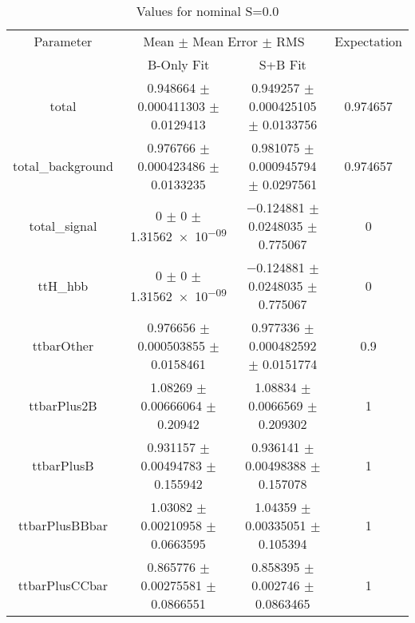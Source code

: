 \begin{table}
\centering
\caption{Values for nominal S=0.0}
\begin{tabular}{cccc}
\toprule
Parameter & \multicolumn{2}{c}{Mean $\pm$ Mean Error $\pm$ RMS} & Expectation\\
 & B-Only Fit & S+B Fit & \\
\midrule
total & \num{0.948664} $\pm$ \num{0.000411303} $\pm$ \num{0.0129413} & \num{0.949257} $\pm$ \num{0.000425105} $\pm$ \num{0.0133756} & \num{0.974657}\\
total\_background & \num{0.976766} $\pm$ \num{0.000423486} $\pm$ \num{0.0133235} & \num{0.981075} $\pm$ \num{0.000945794} $\pm$ \num{0.0297561} & \num{0.974657}\\
total\_signal & \num{0} $\pm$ \num{0} $\pm$ \num{1.31562e-09} & \num{-0.124881} $\pm$ \num{0.0248035} $\pm$ \num{0.775067} & \num{0}\\
ttH\_hbb & \num{0} $\pm$ \num{0} $\pm$ \num{1.31562e-09} & \num{-0.124881} $\pm$ \num{0.0248035} $\pm$ \num{0.775067} & \num{0}\\
ttbarOther & \num{0.976656} $\pm$ \num{0.000503855} $\pm$ \num{0.0158461} & \num{0.977336} $\pm$ \num{0.000482592} $\pm$ \num{0.0151774} & \num{0.9}\\
ttbarPlus2B & \num{1.08269} $\pm$ \num{0.00666064} $\pm$ \num{0.20942} & \num{1.08834} $\pm$ \num{0.0066569} $\pm$ \num{0.209302} & \num{1}\\
ttbarPlusB & \num{0.931157} $\pm$ \num{0.00494783} $\pm$ \num{0.155942} & \num{0.936141} $\pm$ \num{0.00498388} $\pm$ \num{0.157078} & \num{1}\\
ttbarPlusBBbar & \num{1.03082} $\pm$ \num{0.00210958} $\pm$ \num{0.0663595} & \num{1.04359} $\pm$ \num{0.00335051} $\pm$ \num{0.105394} & \num{1}\\
ttbarPlusCCbar & \num{0.865776} $\pm$ \num{0.00275581} $\pm$ \num{0.0866551} & \num{0.858395} $\pm$ \num{0.002746} $\pm$ \num{0.0863465} & \num{1}\\
\bottomrule
\end{tabular}
\end{table}